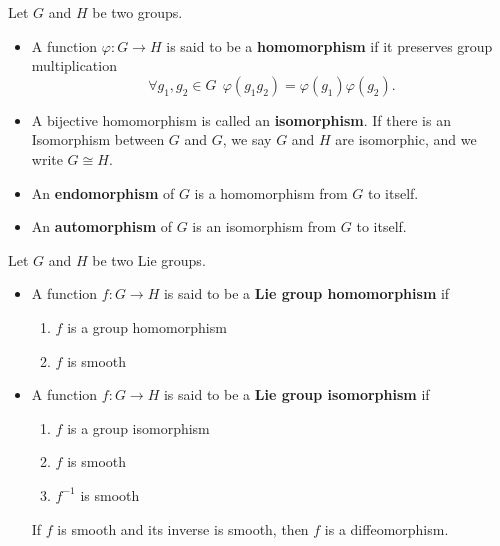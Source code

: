 \begin{definition}
    Let \( G  \) and \( H  \) be two groups.
    \begin{itemize}
        \item A function \( \varphi : G \to H  \) is said to be a \textbf{homomorphism} if it preserves group multiplication  
            \[  \forall {g}_{1}, {g}_{2} \in G \ \ \varphi({g}_{1} {g}_{2}) = \varphi ({g}_{1} ) \varphi({g}_{2}). \]
        \item A bijective homomorphism is called an \textbf{isomorphism}. If there is an Isomorphism between \( G  \) and \( G  \), we say \( G  \) and \( H  \) are isomorphic, and we write \( G \cong H  \). 
        \item An \textbf{endomorphism} of \( G  \) is a homomorphism from \( G \) to itself.
        \item An \textbf{automorphism} of \( G  \) is an isomorphism from \( G \) to itself.
    \end{itemize}
\end{definition}

\begin{definition}
    Let \( G  \) and \( H  \) be two Lie groups.
    \begin{itemize}
        \item A function \( f: G \to H  \) is said to be a \textbf{Lie group homomorphism} if 
            \begin{enumerate}
                \item[(i)] \( f  \) is a group homomorphism 
                \item[(ii)] \( f  \) is smooth
            \end{enumerate}
        \item A function \( f: G \to H \) is said to be a \textbf{Lie group isomorphism} if 
            \begin{enumerate}
                \item[(i)] \( f  \) is a group isomorphism 
                \item[(ii)] \( f  \) is smooth 
                \item[(iii)] \( f^{-1}  \) is smooth
            \end{enumerate}
            If \( f  \) is smooth and its inverse is smooth, then \( f  \) is a diffeomorphism.
    \end{itemize}
\end{definition}

